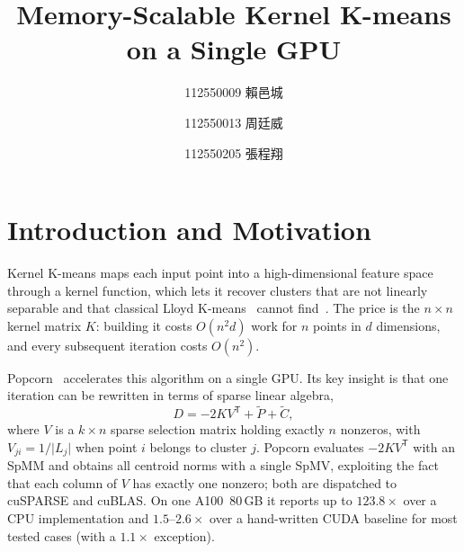 \documentclass[sigconf]{acmart}
\begin{document}
\title{Memory-Scalable Kernel K-means on a Single GPU}

\author{112550009 賴邑城}

\author{112550013 周廷威}

\author{112550205 張程翔}

\renewcommand{\shortauthors}{Lai, Chou and Chang}

\maketitle
\pagestyle{plain}
\thispagestyle{plain}
\raggedbottom


\section{Introduction and Motivation}

Kernel K-means maps each input point into a high-dimensional feature space
through a kernel function, which lets it recover clusters that are not linearly
separable and that classical Lloyd K-means~\cite{lloyd1982} cannot
find~\cite{dhillon2004}. The price is the $n \times n$ kernel matrix $K$:
building it costs $O(n^2 d)$ work for $n$ points in $d$ dimensions, and every
subsequent iteration costs $O(n^2)$.

Popcorn~\cite{popcorn2025} accelerates this algorithm on a single GPU. Its key insight is that one iteration can be
rewritten in terms of sparse linear algebra,
\begin{equation}
  D = -2 K V^{\mathsf{T}} + \tilde{P} + \tilde{C},
  \label{eq:popcorn}
\end{equation}
where $V$ is a $k \times n$ sparse selection matrix holding exactly $n$
nonzeros, with $V_{ji} = 1/\lvert L_j \rvert$ when point $i$ belongs to cluster
$j$. Popcorn evaluates $-2 K V^{\mathsf{T}}$ with an SpMM and obtains all
centroid norms with a single SpMV, exploiting the fact that each column of $V$
has exactly one nonzero; both are dispatched to cuSPARSE and cuBLAS. On one
A100~80\,GB it reports up to $123.8\times$ over a CPU implementation and
$1.5$--$2.6\times$ over a hand-written CUDA baseline for most tested cases
(with a $1.1\times$ exception).
\end{document}
